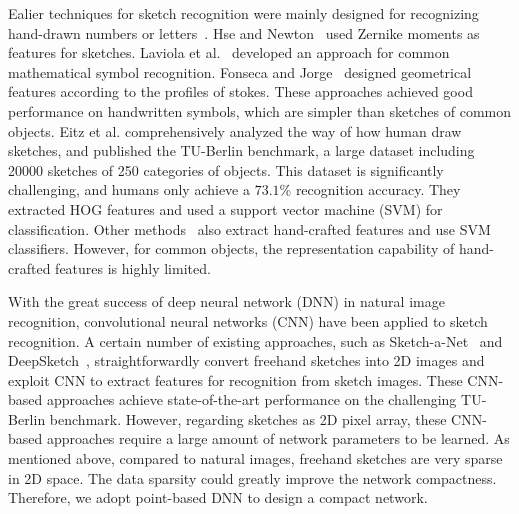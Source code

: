 %
Ealier techniques for sketch recognition were mainly designed for recognizing hand-drawn numbers or letters~\cite{Hse2004SketchedSR, LaViola2004MathPad2AS, Fonseca2000UsingFL}.
Hse and Newton~\cite{Hse2004SketchedSR} used Zernike moments as features for sketches.
Laviola et al.~\cite{LaViola2004MathPad2AS} developed an approach for common mathematical symbol recognition.
Fonseca and Jorge~\cite{Fonseca2000UsingFL} designed geometrical features according to the profiles of stokes.
These approaches achieved good performance on handwritten symbols, which are simpler than sketches of common objects.
%
Eitz et al. \cite{Eitz2012HowDH} comprehensively analyzed the way of how human draw sketches, and published the TU-Berlin benchmark, a large dataset including 20000 sketches of 250 categories of objects.
This dataset is significantly challenging, and humans only achieve a $73.1\%$ recognition accuracy.
%
They extracted HOG features and used a support vector machine (SVM) for classification.
Other methods~\cite{LiHSG15, Schneider2014SketchCA} also extract hand-crafted features and use SVM classifiers.
However, for common objects, the representation capability of hand-crafted features is highly limited.



With the great success of deep neural network (DNN) in natural image recognition, convolutional neural networks (CNN) have been applied to sketch recognition.
A certain number of existing approaches, such as Sketch-a-Net~\cite{Yu2015SketchaNetTB} and DeepSketch~\cite{Seddati2015DeepSketchDC},
straightforwardly convert freehand sketches into 2D images and exploit CNN to extract features for recognition from sketch images.
These CNN-based approaches achieve state-of-the-art performance on the challenging TU-Berlin benchmark.
However, regarding sketches as 2D pixel array, these CNN-based approaches require a large amount of network parameters to be learned.
%
As mentioned above, compared to natural images, freehand sketches are very sparse in 2D space. The data sparsity could greatly improve the network compactness.
Therefore, we adopt point-based DNN to design a compact network.

